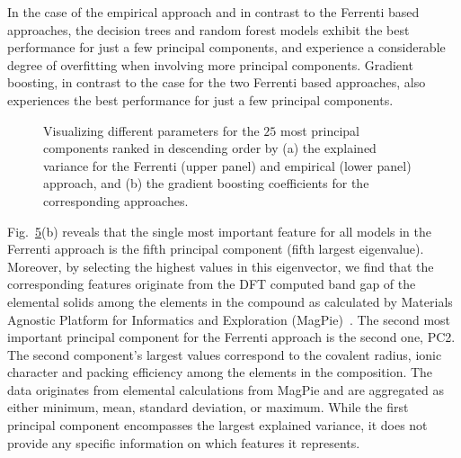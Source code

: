 \documentclass[superscriptaddress,unsortedaddress,
 amsmath,amssymb,
 aps,
]{revtex4-2}
\begin{document}
In the case of the empirical approach and in contrast to the Ferrenti based approaches, the decision trees and random forest models exhibit the best performance for just a few principal components, and experience a considerable degree of overfitting 
when involving more principal components. Gradient boosting, in contrast to the case for the two Ferrenti based approaches, also experiences the best performance for just a few principal components. 
\begin{figure}[ht]
    \centering
    \begin{subfigure}[b]{0.45\textwidth}
        
        \label{fig:01-fi-e}
    \end{subfigure}
    \begin{subfigure}[b]{0.45\textwidth}
        
        \label{fig:01-fi-d}
    \end{subfigure}%
    \hfill
    \begin{subfigure}[b]{0.45\textwidth}
        
        \label{fig:03-fi-e}
        \subcaption{}
    \end{subfigure}
    \begin{subfigure}[b]{0.45\textwidth}
        
        \label{fig:03-fi-d}
        \subcaption{}
    \end{subfigure}
    \caption{Visualizing different parameters for the $25$ most principal components ranked in descending order by (a) the explained variance for the Ferrenti (upper panel) and empirical (lower panel) approach, and (b) the gradient boosting coefficients for the corresponding approaches. 
    }
    \label{fig:PComponents}
\end{figure}

Fig.~\ref{fig:PComponents}(b) reveals that the single most important feature for all models in the Ferrenti approach is the fifth principal component (fifth largest eigenvalue). Moreover, by selecting the highest values in this eigenvector, we find that the corresponding features originate from the DFT computed band gap of the elemental solids among the elements in the compound as calculated by Materials Agnostic Platform for Informatics and Exploration (MagPie)~\cite{magpie}. 
The second most important principal component for the Ferrenti approach is the second one, PC2. 
The second component's largest values correspond to the 
covalent radius, ionic character and packing efficiency  
among the elements in the composition. 
The data originates from elemental calculations from MagPie and are aggregated as either minimum, mean, standard deviation, or maximum. 
While the first principal component encompasses the largest explained variance, it does not provide any specific information on which features it represents.
\end{document}
